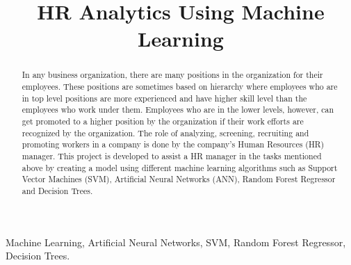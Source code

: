 \documentclass[11pt,conference]{IEEEtran}
\begin{document}
\title{HR Analytics Using Machine Learning}

\author{
\and
{}
\and
{}
}
\maketitle

\begin{abstract}
In any business organization, there are many positions in the organization for their employees. These positions are sometimes based on hierarchy where employees who are in top level positions are more experienced and have higher skill level than the employees who work under them. Employees who are in the lower levels, however, can get promoted to a higher position by the organization if their work efforts are recognized by the organization. The role of analyzing, screening, recruiting and promoting workers in a company is done by the company’s Human Resources (HR) manager. This project is developed to assist a HR manager in the tasks mentioned above by creating a model using different machine learning algorithms such as Support Vector Machines (SVM), Artificial Neural Networks (ANN), Random Forest Regressor and Decision Trees.
\end{abstract}

\begin{IEEEkeywords}
Machine Learning, Artificial Neural Networks, SVM, Random Forest Regressor, Decision Trees.
\end{IEEEkeywords}
\end{document}
